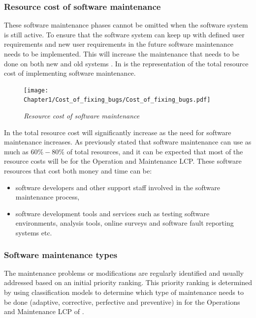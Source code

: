 \subsubsection{Resource cost of software maintenance}
These software maintenance phases cannot be omitted when the software system is still active. To ensure that the software system can keep up with defined user requirements and new user requirements in the future software maintenance needs to be implemented.  This will increase the maintenance that needs to be done on both new and old systems \cite{Niu2018, Galster2019, Hasan2012}. In  is the representation of the total resource cost of implementing software maintenance.

\begin{figure}[!htb]
	\centering %
	\texttt{[image: Chapter1/Cost\_of\_fixing\_bugs/Cost\_of\_fixing\_bugs.pdf]}
	\caption[Resource cost of software maintenance]
	{\textit{Resource cost of software maintenance \cite{Ogheneovo2014}}}\label{fig:ch1_costsOfFixingBugs}
\end{figure}

In  the total resource cost will significantly increase as the need for software maintenance increases. As previously stated that software maintenance can use as much as $60\%-80\%$ of total resources, and it can be expected that most of the resource costs will be for the Operation and Maintenance LCP. These software resources that cost both money and time can be:

\begin{itemize}
	\item software developers and other support staff involved in the software maintenance process,
	\item software development tools and services such as testing software environments, analysis tools, online surveys and software fault reporting systems etc.
\end{itemize}

\subsubsection{Software maintenance types}
The maintenance problems or modifications are regularly identified and usually addressed based on an initial priority ranking. This priority ranking is determined by using classification models to determine which type of maintenance needs to be done (adaptive, corrective, perfective and preventive) in  for the Operations and Maintenance LCP of  \cite{Tang2010, Mamone1994, Ping2010}.


